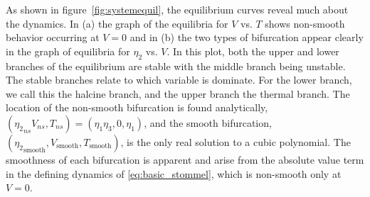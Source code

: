 As shown in figure~\ref{fig:systemequil}, the equilibrium curves reveal much about the dynamics. In (a) the graph of the equilibria for $V$ vs. $T$ shows non-smooth behavior occurring at $V=0$ and in (b) the two types of bifurcation appear clearly in the graph of equilibria for $\eta_2$ vs. $V$. In this plot, both the upper and lower branches of the equilibrium are stable with the middle branch being unstable. The stable branches relate to which variable is dominate. For the lower branch, we call this the halcine branch, and the upper branch the thermal branch. The location of the non-smooth bifurcation is found analytically, $({\eta_2}_{ns}V_{ns},T_{ns})=(\eta_1\eta_3,0,\eta_1)$, and the smooth bifurcation, $({\eta_2}_{\text{smooth}},V_{\text{smooth}},T_{\text{smooth}})$, is the only real solution to a cubic polynomial. The smoothness of each bifurcation is apparent and arise from the absolute value term in the defining dynamics of \eqref{eq:basic_stommel}, which is non-smooth only at $V=0$.

